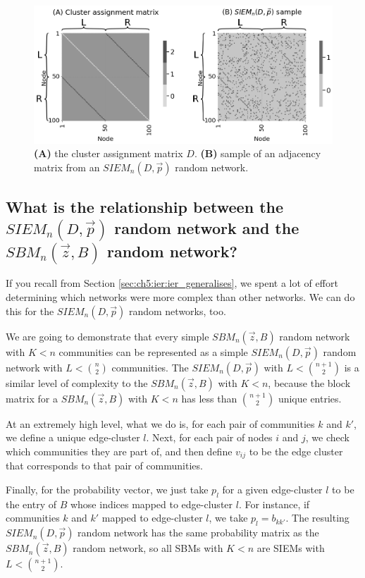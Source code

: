 \begin{figure}[h]
    \centering
    \includegraphics[width=\linewidth]{representations/ch5/Images/siem.png}
    \caption[Visualizing SIEM networks]{\textbf{(A)} the cluster assignment matrix $D$. \textbf{(B)} sample of an adjacency matrix from an $SIEM_n(D, \vec p)$ random network. }
    \label{fig:ch5:siem}
\end{figure}
\subsection{What is the relationship between the $SIEM_n(D, \vec p)$ random network and the $SBM_n(\vec z, B)$ random network?}

If you recall from Section \ref{sec:ch5:ier:ier_generalises}, we spent a lot of effort determining which networks were more complex than other networks. We can do this for the $SIEM_n(D, \vec p)$ random networks, too. 

We are going to demonstrate that every simple $SBM_n(\vec z, B)$ random network with $K < n$ communities can be represented as a simple $SIEM_n(D, \vec p)$ random network with $L < \binom n 2$ communities. The $SIEM_n(D, \vec p)$ with $L < \binom{n + 1}{2}$ is a similar level of complexity to the $SBM_n(\vec z, B)$ with $K < n$, because the block matrix for a $SBM_n(\vec z, B)$ with $K < n$ has less than $\binom{n + 1}{2}$ unique entries.

At an extremely high level, what we do is, for each pair of communities $k$ and $k'$, we define a unique edge-cluster $l$. Next, for each pair of nodes $i$ and $j$, we check which communities they are part of, and then define $v_{ij}$ to be the edge cluster that corresponds to that pair of communities.

Finally, for the probability vector, we just take $p_l$ for a given edge-cluster $l$ to be the entry of $B$ whose indices mapped to edge-cluster $l$. For instance, if communities $k$ and $k'$ mapped to edge-cluster $l$, we take $p_l = b_{kk'}$. The resulting $SIEM_n(D, \vec p)$ random network has the same probability matrix as the $SBM_n(\vec z, B)$ random network, so all SBMs  with $K < n$ are SIEMs with $L < \binom{n + 1}{2}$.

